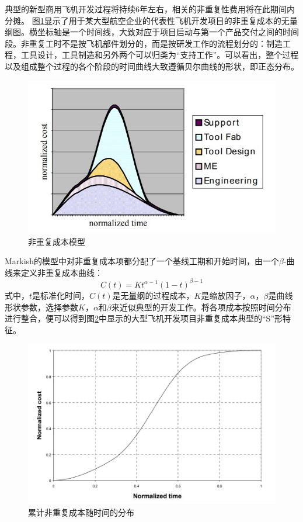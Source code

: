 \documentclass[12pt,a4paper]{report}
\begin{document}
典型的新型商用飞机开发过程将持续6年左右，相关的非重复性费用将在此期间内分摊。 图\ref{fig:NRC_time}显示了用于某大型航空企业的代表性飞机开发项目的非重复成本的无量纲图。横坐标轴是一个时间线，大致对应于项目启动与第一个产品交付之间的时间段。非重复工时不是按飞机部件划分的，而是按研发工作的流程划分的：制造工程，工具设计，工具制造和另外两个可以归类为“支持工作”。可以看出，整个过程以及组成整个过程的各个阶段的时间曲线大致遵循贝尔曲线的形状，即正态分布。
\begin{figure}[!htp]
  \centering
  \includegraphics[width=.9\textwidth]{eps/NRC_BellCurve.jpg}
  \caption{非重复成本模型\cite{Markish2002valuation}}
 \label{fig:NRC_time}
\end{figure}

Markish\cite{Markish2002valuation}的模型中对非重复成本项都分配了一个基线工期和开始时间，由一个$\beta$-曲线来定义非重复成本曲线：
\begin{equation}
\label{eq:NRC_time}
C(t)=Kt^{\alpha-1}(1-t)^{\beta-1}
\end{equation}
式中，$t$是标准化时间，$C(t)$是无量纲的过程成本，$K$是缩放因子，$\alpha$，$\beta$是曲线形状参数，选择参数$K$，$\alpha$和$\beta$来近似典型的开发工作。将各项成本按照时间分布进行整合，便可以得到图\ref{fig:NRCdistribution}中显示的大型飞机开发项目非重复成本典型的“S”形特征。
\begin{figure}[!htp]
  \centering
  \includegraphics[width=.9\textwidth]{eps/NRC_S.jpg}
  \caption{累计非重复成本随时间的分布\cite{Markish2002multi}}
 \label{fig:NRCdistribution}
\end{figure}
\end{document}
